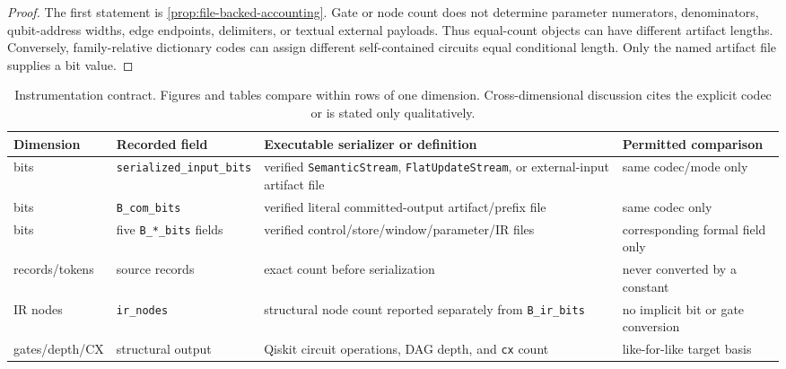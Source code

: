 \documentclass[aps,prx,reprint,floatfix,superscriptaddress]{revtex4-2}
\begin{document}
\begin{proof}
The first statement is \cref{prop:file-backed-accounting}.  Gate or node count
does not determine parameter numerators, denominators, qubit-address widths,
edge endpoints, delimiters, or textual external payloads.  Thus equal-count
objects can have different artifact lengths.  Conversely, family-relative
dictionary codes can assign different self-contained circuits equal
conditional length.  Only the named artifact file supplies a bit value.
\end{proof}

\begin{table}[!t]
\centering
\scriptsize
\setlength{\tabcolsep}{3pt}
\begin{tabularx}{\textwidth}{@{}l l X X@{}}
\toprule
Dimension & Recorded field & Executable serializer or definition & Permitted comparison \\
\midrule
bits & \texttt{serialized\_input\_bits} & verified \texttt{SemanticStream}, \texttt{FlatUpdateStream}, or external-input artifact file & same codec/mode only \\
bits & \texttt{B\_com\_bits} & verified literal committed-output artifact/prefix file & same codec only \\
bits & five \texttt{B\_*\_bits} fields & verified control/store/window/parameter/IR files & corresponding formal field only \\
records/tokens & source records & exact count before serialization & never converted by a constant \\
IR nodes & \texttt{ir\_nodes} & structural node count reported separately from \texttt{B\_ir\_bits} & no implicit bit or gate conversion \\
gates/depth/CX & structural output & Qiskit circuit operations, DAG depth, and \texttt{cx} count & like-for-like target basis \\
\bottomrule
\end{tabularx}
\caption{Instrumentation contract.  Figures and tables compare within rows of
one dimension.  Cross-dimensional discussion cites the explicit codec or is
stated only qualitatively.}
\label{tab:instrumentation-contract}
\end{table}
\end{document}
